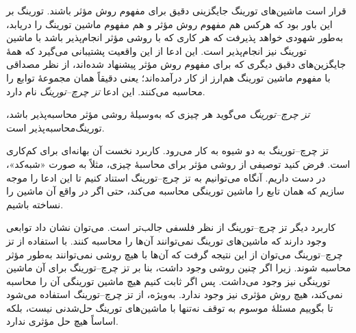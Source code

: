 \documentclass[../../../include/open-logic-section]{subfiles}
\begin{document}

قرار است ماشین‌های تورینگ جایگزینی دقیق برای مفهوم روش مؤثر باشند.
تورینگ بر این باور بود که هرکس هم مفهوم روش مؤثر و هم مفهوم ماشین
تورینگ را دریابد، به‌طور شهودی خواهد پذیرفت که هر کاری که با روشی
مؤثر انجام‌پذیر باشد با ماشین تورینگ نیز انجام‌پذیر است. این ادعا از
این واقعیت پشتیبانی می‌گیرد که همهٔ جایگزین‌های دقیق دیگری که برای
مفهوم روش مؤثر پیشنهاد شده‌اند، از نظر مصداقی با مفهوم ماشین تورینگ
هم‌ارز از کار درآمده‌اند؛ یعنی دقیقاً همان مجموعهٔ توابع را محاسبه
می‌کنند. این ادعا \emph{تز چرچ--تورینگ} نام دارد.

\begin{defn}
\emph{تز چرچ--تورینگ} می‌گوید هر چیزی که به‌وسیلهٔ روشی مؤثر
محاسبه‌پذیر باشد، تورینگ‌محاسبه‌پذیر است.
\end{defn}

تز چرچ--تورینگ به دو شیوه به کار می‌رود. کاربرد نخست آن بهانه‌ای برای
کم‌کاری است. فرض کنید توصیفی از روشی مؤثر برای محاسبهٔ چیزی، مثلاً به
صورت «شبه‌کد»، در دست داریم. آنگاه می‌توانیم به تز چرچ--تورینگ استناد
کنیم تا این ادعا را موجه سازیم که همان تابع را ماشین تورینگی محاسبه
می‌کند، حتی اگر در واقع آن ماشین را نساخته باشیم.

کاربرد دیگر تز چرچ--تورینگ از نظر فلسفی جالب‌تر است. می‌توان نشان داد
توابعی وجود دارند که ماشین‌های تورینگ نمی‌توانند آن‌ها را محاسبه
کنند. با استفاده از تز چرچ--تورینگ می‌توان از این نتیجه گرفت که آن‌ها
با هیچ روشی نمی‌توانند به‌طور مؤثر محاسبه شوند. زیرا اگر چنین روشی
وجود داشت، بنا بر تز چرچ--تورینگ برای آن ماشین تورینگی نیز وجود
می‌داشت. پس اگر ثابت کنیم هیچ ماشین تورینگی آن را محاسبه نمی‌کند،
هیچ روش مؤثری نیز وجود ندارد. به‌ویژه، از تز چرچ--تورینگ استفاده
می‌شود تا بگوییم مسئلهٔ موسوم به توقف نه‌تنها با ماشین‌های تورینگ
حل‌شدنی نیست، بلکه اساساً هیچ حل مؤثری ندارد.
\end{document}
